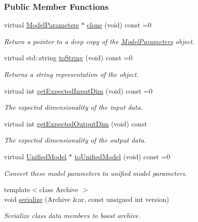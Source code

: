\subsubsection*{Public Member Functions}
\begin{DoxyCompactItemize}
\item 
virtual \hyperlink{classDmpBbo_1_1ModelParameters}{Model\+Parameters} $\ast$ \hyperlink{classDmpBbo_1_1ModelParameters_a491a5c84b21c8577748ca7e83a9b4751}{clone} (void) const =0
\begin{DoxyCompactList}\small\item\em Return a pointer to a deep copy of the \hyperlink{classDmpBbo_1_1ModelParameters}{Model\+Parameters} object. \end{DoxyCompactList}\item 
virtual std\+::string \hyperlink{classDmpBbo_1_1ModelParameters_af084bff2ddd6233e9a898faa23f6195c}{to\+String} (void) const =0
\begin{DoxyCompactList}\small\item\em Returns a string representation of the object. \end{DoxyCompactList}\item 
virtual int \hyperlink{classDmpBbo_1_1ModelParameters_af4d8412e83487a72b7f8929c716d6d8f}{get\+Expected\+Input\+Dim} (void) const =0
\begin{DoxyCompactList}\small\item\em The expected dimensionality of the input data. \end{DoxyCompactList}\item 
virtual int \hyperlink{classDmpBbo_1_1ModelParameters_ab1a7cb7c0bf6fe5afd5561fa6f27ba7b}{get\+Expected\+Output\+Dim} (void) const 
\begin{DoxyCompactList}\small\item\em The expected dimensionality of the output data. \end{DoxyCompactList}\item 
virtual \hyperlink{classDmpBbo_1_1UnifiedModel}{Unified\+Model} $\ast$ \hyperlink{classDmpBbo_1_1ModelParameters_a9d1c72e871e8fa37857f9ce7eabe5a04}{to\+Unified\+Model} (void) const =0
\begin{DoxyCompactList}\small\item\em Convert these model parameters to unified model parameters. \end{DoxyCompactList}\item 
{\footnotesize template$<$class Archive $>$ }\\void \hyperlink{classDmpBbo_1_1ModelParameters_a68e832cb064e3b7ca978d8e5911cf700}{serialize} (Archive \&ar, const unsigned int version)
\begin{DoxyCompactList}\small\item\em Serialize class data members to boost archive. \end{DoxyCompactList}\end{DoxyCompactItemize}
